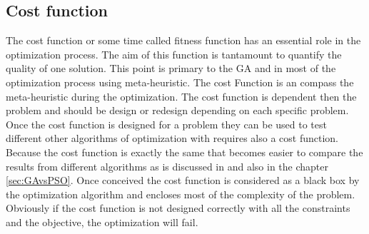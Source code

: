 
%
%
%




\subsection{Cost function }\label{sec:CostFunctionGA}
	The cost function or some time called fitness function has an essential role in the optimization process.  The aim of this function is tantamount to quantify the quality of one solution. This point is primary to the GA and in most of the optimization process using meta-heuristic. The cost Function is an compass the meta-heuristic during the  optimization. 
	The cost function is dependent then the problem and should be design or redesign depending on each specific  problem. Once the cost function is designed for a problem they can be used to test different other algorithms of optimization with requires also a cost function. 
	Because the cost function is exactly the same that becomes easier to compare the results from different algorithms as is discussed in \cite{79*franccois2001} and also in the chapter \ref{sec:GAvsPSO}.%
	Once conceived the cost function is considered as a black box by the optimization algorithm and encloses most of the complexity of the problem. Obviously if the cost function is not designed correctly with all the constraints and the objective, the optimization will fail.\\

